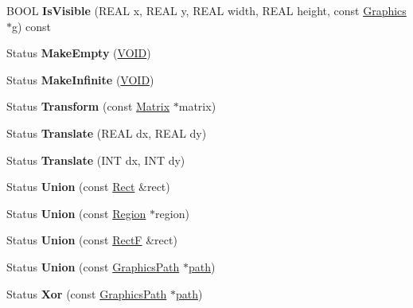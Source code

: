 \begin{DoxyCompactItemize}
B\+O\+OL {\bfseries Is\+Visible} (R\+E\+AL x, R\+E\+AL y, R\+E\+AL width, R\+E\+AL height, const \hyperlink{class_graphics}{Graphics} $\ast$g) const
\item 
\mbox{\label{class_region_ad5b51c0fb0ae88d36406fc8f1a0927eb}} 
Status {\bfseries Make\+Empty} (\hyperlink{interfacevoid}{V\+O\+ID})
\item 
\mbox{\label{class_region_ad2d133e23f0e051833f870571d45042b}} 
Status {\bfseries Make\+Infinite} (\hyperlink{interfacevoid}{V\+O\+ID})
\item 
\mbox{\label{class_region_a870dbb2b225760501251057ab89adb3c}} 
Status {\bfseries Transform} (const \hyperlink{class_matrix}{Matrix} $\ast$matrix)
\item 
\mbox{\label{class_region_a20b1b224fc83e1d2c958f682fdb2d14d}} 
Status {\bfseries Translate} (R\+E\+AL dx, R\+E\+AL dy)
\item 
\mbox{\label{class_region_a9d019d2e276507849ea74c599e80f1bb}} 
Status {\bfseries Translate} (I\+NT dx, I\+NT dy)
\item 
\mbox{\label{class_region_a6d157f3dceb8e8951dd80230f351bc0d}} 
Status {\bfseries Union} (const \hyperlink{struct_rect}{Rect} \&rect)
\item 
\mbox{\label{class_region_a0818b91e61332a68c83f5880aaf8e039}} 
Status {\bfseries Union} (const \hyperlink{class_region}{Region} $\ast$region)
\item 
\mbox{\label{class_region_a3a4e6ddd06f396629d49d34d3dec559a}} 
Status {\bfseries Union} (const \hyperlink{struct_rect_f}{RectF} \&rect)
\item 
\mbox{\label{class_region_a131f63e017f55c0faa96a989408c97ab}} 
Status {\bfseries Union} (const \hyperlink{class_graphics_path}{Graphics\+Path} $\ast$\hyperlink{structpath}{path})
\item 
\mbox{\label{class_region_ab6819e38939bf0ab3111ff5194888507}} 
Status {\bfseries Xor} (const \hyperlink{class_graphics_path}{Graphics\+Path} $\ast$\hyperlink{structpath}{path})

\end{DoxyCompactItemize}
